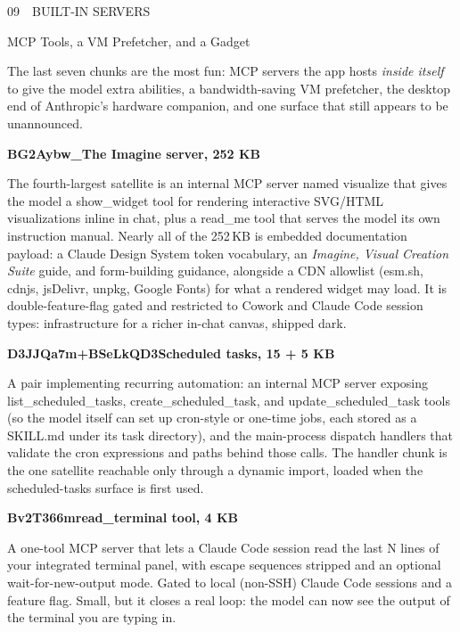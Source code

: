 \documentclass[11pt]{article}
\newcommand{\mono}{\ttfamily}
\newcommand{\reppar}[1]{{\fontsize{10.5}{15.2}\selectfont #1\par}\vspace{8pt}}
\newcommand{\code}[1]{{\mono\small #1}}
\newcommand{\reportsection}[3]{%
  \vspace{14pt}%
  {\mono\footnotesize\color{baseMid}\addfontfeatures{LetterSpace=8.0}\MakeUppercase{#1\, \textbullet\, #2}}\par
  \vspace{3pt}%
  {\heavy\fontsize{17}{19}\selectfont\color{base900} #3\par}
  \vspace{4pt}{\color{accent}\hrule height 1.6pt}\vspace{9pt}%
}
\newcommand{\chunkhead}[2]{%
  \vspace{4pt}%
  {\fontsize{10.5}{15.2}\selectfont
   {\mono\bfseries\color{accentink}#1}\;\textbullet\;\textbf{#2}\par}
  \vspace{2pt}}
\begin{document}
\reportsection{09}{Built-In Servers}{MCP Tools, a VM Prefetcher, and a Gadget}

\reppar{The last seven chunks are the most fun: MCP servers the app hosts \textit{inside itself} to give the model extra abilities, a bandwidth-saving VM prefetcher, the desktop end of Anthropic's hardware companion, and one surface that still appears to be unannounced.}

\chunkhead{BG2Aybw\_}{The Imagine server, 252 KB}
\reppar{The fourth-largest satellite is an internal MCP server named \code{visualize} that gives the model a \code{show\_widget} tool for rendering interactive SVG/HTML visualizations inline in chat, plus a \code{read\_me} tool that serves the model its own instruction manual. Nearly all of the 252\,KB is embedded documentation payload: a Claude Design System token vocabulary, an \textit{Imagine, Visual Creation Suite} guide, and form-building guidance, alongside a CDN allowlist (esm.sh, cdnjs, jsDelivr, unpkg, Google Fonts) for what a rendered widget may load. It is double-feature-flag gated and restricted to Cowork and Claude Code session types: infrastructure for a richer in-chat canvas, shipped dark.}

\chunkhead{D3JJQa7m\;+\;BSeLkQD3}{Scheduled tasks, 15 + 5 KB}
\reppar{A pair implementing recurring automation: an internal MCP server exposing \code{list\_scheduled\_tasks}, \code{create\_scheduled\_task}, and \code{update\_scheduled\_task} tools (so the model itself can set up cron-style or one-time jobs, each stored as a \code{SKILL.md} under its task directory), and the main-process dispatch handlers that validate the cron expressions and paths behind those calls. The handler chunk is the one satellite reachable only through a dynamic import, loaded when the scheduled-tasks surface is first used.}

\chunkhead{Bv2T366m}{read\_terminal tool, 4 KB}
\reppar{A one-tool MCP server that lets a Claude Code session read the last N lines of your integrated terminal panel, with escape sequences stripped and an optional wait-for-new-output mode. Gated to local (non-SSH) Claude Code sessions and a feature flag. Small, but it closes a real loop: the model can now see the output of the terminal you are typing in.}
\end{document}
